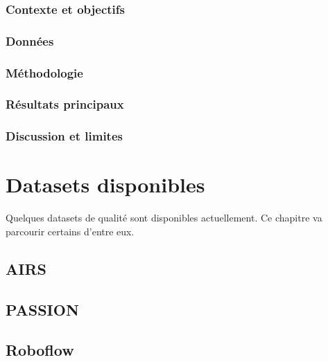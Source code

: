 \subsubsection{Contexte et objectifs}

\subsubsection{Données}

\subsubsection{Méthodologie}

\subsubsection{Résultats principaux}

\subsubsection{Discussion et limites}


\section{Datasets disponibles}

\par{Quelques datasets de qualité sont disponibles actuellement. Ce chapitre va parcourir certains d'entre eux.}

\subsection{AIRS}

\subsection{PASSION}

\subsection{Roboflow}

